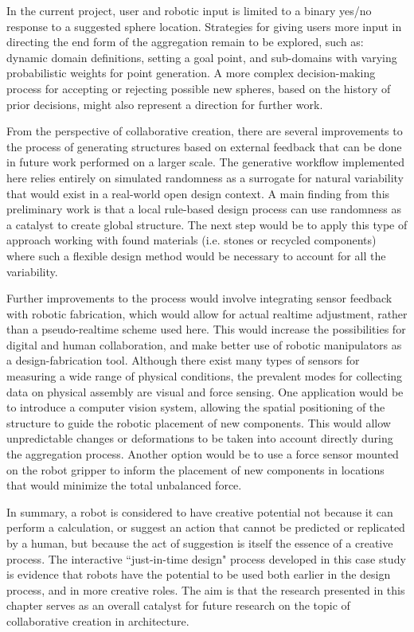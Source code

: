    In the current project, user and robotic input is limited to a binary yes/no response to a suggested sphere location. Strategies for giving users more input in directing the end form of the aggregation remain to be explored, such as: dynamic domain definitions, setting a goal point, and sub-domains with varying probabilistic weights for point generation. A more complex decision-making process for accepting or rejecting possible new spheres, based on the history of prior decisions, might also represent a direction for further work.

    From the perspective of collaborative creation, there are several improvements to the process of generating structures based on external feedback that can be done in future work performed on a larger scale. The generative workflow implemented here relies entirely on simulated randomness as a surrogate for natural variability that would exist in a real-world open design context. A main finding from this preliminary work is that a local rule-based design process can use randomness as a catalyst to create global structure. The next step would be to apply this type of approach working with found materials (i.e. stones or recycled components) where such a flexible design method would be necessary to account for all the variability.
    
    Further improvements to the process would involve integrating sensor feedback with robotic fabrication, which would allow for actual realtime adjustment, rather than a pseudo-realtime scheme used here. This would increase the possibilities for digital and human collaboration, and make better use of robotic manipulators as a design-fabrication tool. Although there exist many types of sensors for measuring a wide range of physical conditions, the prevalent modes for collecting data on physical assembly are visual and force sensing. One application would be to introduce a computer vision system, allowing the spatial positioning of the structure to guide the robotic placement of new components. This would allow unpredictable changes or deformations to be taken into account directly during the aggregation process. Another option would be to use a force sensor mounted on the robot gripper to inform the placement of new components in locations that would minimize the total unbalanced force. 
    
    In summary, a robot is considered to have creative potential not because it can perform a calculation, or suggest an action that cannot be predicted or replicated by a human, but because the act of suggestion is itself the essence of a creative process. The interactive ``just-in-time design" process developed in this case study is evidence that robots have the potential to be used both earlier in the design process, and in more creative roles. The aim is that the research presented in this chapter serves as an overall catalyst for future research on the topic of collaborative creation in architecture.



